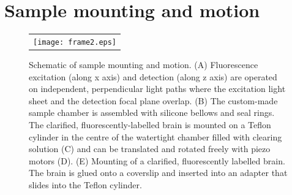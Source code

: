 \documentclass[12pt]{spieman}  %
\begin{document}
\section{Sample mounting and motion}
\label{sec:mounting}
%
		
\begin{figure}
   \begin{center}
   \begin{tabular}{c}
   \texttt{[image: frame2.eps]}
   \end{tabular}
   \end{center}
   \caption{\label{fig:frame2} Schematic of sample mounting and motion. (A) Fluorescence excitation (along x axis) and detection (along z axis) are operated on independent, perpendicular light paths where the excitation light sheet and the detection focal plane overlap. (B) The custom-made sample chamber is assembled with silicone bellows and seal rings. The clarified, fluorescently-labelled brain is mounted on a Teflon cylinder in the centre of the watertight chamber filled with clearing solution (C) and can be translated and rotated freely with piezo motors (D). (E) Mounting of a clarified, fluorescently labelled brain. The brain is glued onto a coverslip and inserted into an adapter that slides into the Teflon cylinder.} 
   \end{figure}		
\end{document}
